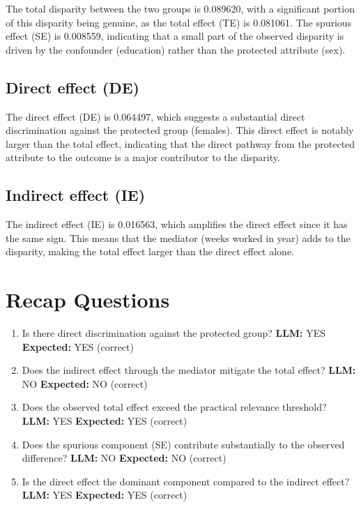 \documentclass[11pt]{article}
\begin{document}
The total disparity between the two groups is 0.089620, with a significant portion of this disparity being genuine, as the total effect (TE) is 0.081061. The spurious effect (SE) is 0.008559, indicating that a small part of the observed disparity is driven by the confounder (education) rather than the protected attribute (sex).

\subsection{Direct effect (DE)}

The direct effect (DE) is 0.064497, which suggests a substantial direct discrimination against the protected group (females). This direct effect is notably larger than the total effect, indicating that the direct pathway from the protected attribute to the outcome is a major contributor to the disparity.

\subsection{Indirect effect (IE)}

The indirect effect (IE) is 0.016563, which amplifies the direct effect since it has the same sign. This means that the mediator (weeks worked in year) adds to the disparity, making the total effect larger than the direct effect alone.

\section{Recap Questions}

\begin{enumerate}
\item Is there direct discrimination against the protected group? \textbf{LLM:} YES \quad \textbf{Expected:} YES \quad (correct)
\item Does the indirect effect through the mediator mitigate the total effect? \textbf{LLM:} NO \quad \textbf{Expected:} NO \quad (correct)
\item Does the observed total effect exceed the practical relevance threshold? \textbf{LLM:} YES \quad \textbf{Expected:} YES \quad (correct)
\item Does the spurious component (SE) contribute substantially to the observed difference? \textbf{LLM:} NO \quad \textbf{Expected:} NO \quad (correct)
\item Is the direct effect the dominant component compared to the indirect effect? \textbf{LLM:} YES \quad \textbf{Expected:} YES \quad (correct)
\end{enumerate}
\end{document}
